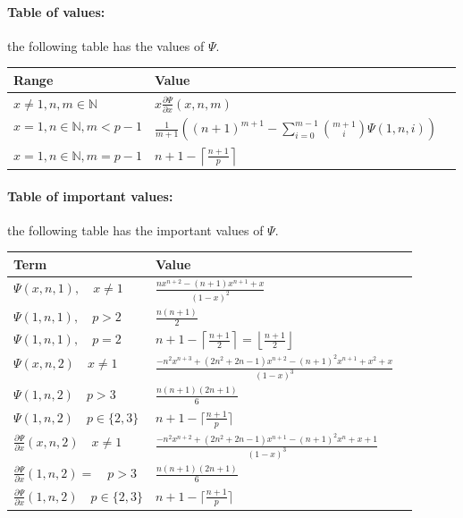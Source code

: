 \documentclass[]{article}
\begin{document}
 \paragraph{Table of values: }the following table has the values of $\Psi.$
 \newline
 \begin{tabularx}{1.2\textwidth} { 
 		| >{\raggedright\arraybackslash}X 
 		| >{\centering\arraybackslash}X 
 		| >{\raggedleft\arraybackslash}X | }
 	\hline
 	Range & Value \\
 	\hline
 	$x\neq 1, n,m\in\mathbb{N}$ &  $x\frac{\partial \Psi}{\partial x}(x,n,m)$  \\
 	\hline
 	
 	$x=1,n\in\mathbb{N},m<p-1$ &  $\frac{1}{m+1}\left((n+1)^{m+1}-\sum_{i=0}^{m-1}{m+1 \choose i}\Psi(1,n,i)\right)$ \\
 	\hline
 	$x=1,n\in\mathbb{N},m=p-1$ & $n+1-\left\lceil\frac{n+1}{p}\right\rceil$  \\
 	\hline
 \end{tabularx}

 \paragraph{Table of important values: }the following table has the important values of $\Psi.$
\newline
\begin{tabularx}{1.2\textwidth} { 
		| >{\raggedright\arraybackslash}X 
		| >{\centering\arraybackslash}X 
		| >{\raggedleft\arraybackslash}X | }
	\hline
	Term & Value \\
	\hline
	$\Psi(x,n,1),\quad x\neq 1$ &  $\frac{nx^{n+2}-(n+1)x^{n+1}+x}{(1-x)^2}$  \\
	\hline
	$\Psi(1,n,1),\quad p>2$ &  $\frac{n(n+1)}{2}$  \\
	\hline
	$\Psi(1,n,1),\quad p=2$ &  $n+1-\left\lceil\frac{n+1}{2}\right\rceil=\left\lfloor\frac{n+1}{2}\right\rfloor$  \\
	\hline
	$\Psi(x,n,2)\quad x\neq 1$&$\frac{-n^2x^{n+3}+(2n^2+2n-1)x^{n+2}-(n+1)^2x^{n+1}+x^2+x}{(1-x)^3}$\\
	\hline
	$\Psi(1,n,2) \quad p>3$ & $\frac{n(n+1)(2n+1)}{6}$\\
	\hline
	$\Psi(1,n,2) \quad p\in\{2,3\}$ & $n+1-\lceil \frac{n+1}{p}\rceil$ \\
	\hline
		$\frac{\partial\Psi}{\partial x}(x,n,2)\quad x\neq 1$&$\frac{-n^2x^{n+2}+(2n^2+2n-1)x^{n+1}-(n+1)^2x^n+x+1}{(1-x)^3}$\\
	\hline
	$\frac{\partial\Psi}{\partial x}(1,n,2)= \quad p>3$ & $\frac{n(n+1)(2n+1)}{6}$\\
	\hline
	$\frac{\partial\Psi}{\partial x}(1,n,2) \quad p\in\{2,3\}$ & $n+1-\lceil \frac{n+1}{p}\rceil$ \\
	\hline
\end{tabularx}
 \pagebreak
\end{document}
